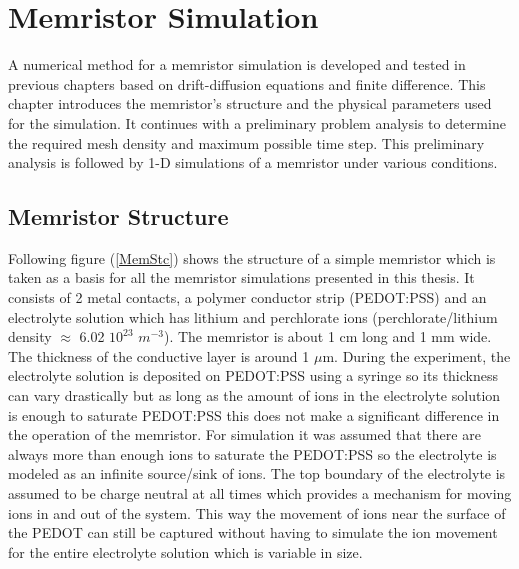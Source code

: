 
\chapter{Memristor Simulation} %

\label{Chapter5} %


\begin{doublespace}

A numerical method for a memristor simulation is developed and tested in previous chapters based on drift-diffusion equations and finite difference. This chapter introduces the memristor's structure and the physical parameters used for the simulation. It continues with a preliminary problem analysis to determine the required mesh density and maximum possible time step. This preliminary analysis is followed by 1-D simulations of a memristor under various conditions.


\section{Memristor Structure}

Following figure (\ref{MemStc}) shows the structure of a simple memristor which is taken as a basis for all the memristor simulations presented in this thesis. It consists of 2 metal contacts, a polymer conductor strip (PEDOT:PSS) and an electrolyte solution which has lithium and perchlorate ions (perchlorate/lithium density $\approx$ 6.02 $10^{23}$ $m^{-3}$). The memristor is about 1 cm long and 1 mm wide. The thickness of the conductive layer is around 1 $\mu$m. During the experiment, the electrolyte solution is deposited on PEDOT:PSS using a syringe so its thickness can vary drastically but as long as the amount of ions in the electrolyte solution is enough to saturate PEDOT:PSS this does not make a significant difference in the operation of the memristor. For simulation it was assumed that there are always more than enough ions to saturate the PEDOT:PSS so the electrolyte is modeled as an infinite source/sink of ions. The top boundary of the electrolyte is assumed to be charge neutral at all times which provides a mechanism for moving ions in and out of the system. This way the movement of ions near the surface of the PEDOT can still be captured without having to simulate the ion movement for the entire electrolyte solution which is variable in size. 


\end{doublespace}
